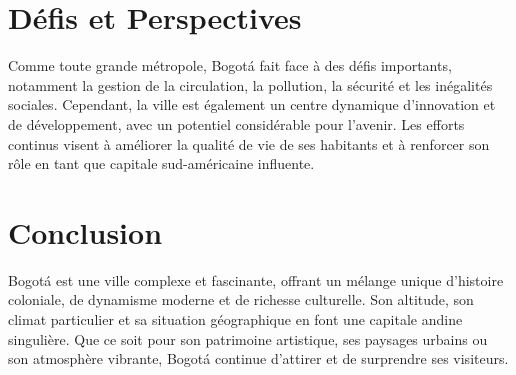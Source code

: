 \documentclass{article}
\begin{document}
\section{Défis et Perspectives}
Comme toute grande métropole, Bogotá fait face à des défis importants, notamment la gestion de la circulation, la pollution, la sécurité et les inégalités sociales. Cependant, la ville est également un centre dynamique d'innovation et de développement, avec un potentiel considérable pour l'avenir. Les efforts continus visent à améliorer la qualité de vie de ses habitants et à renforcer son rôle en tant que capitale sud-américaine influente.

\section{Conclusion}
Bogotá est une ville complexe et fascinante, offrant un mélange unique d'histoire coloniale, de dynamisme moderne et de richesse culturelle. Son altitude, son climat particulier et sa situation géographique en font une capitale andine singulière. Que ce soit pour son patrimoine artistique, ses paysages urbains ou son atmosphère vibrante, Bogotá continue d'attirer et de surprendre ses visiteurs.
\end{document}
